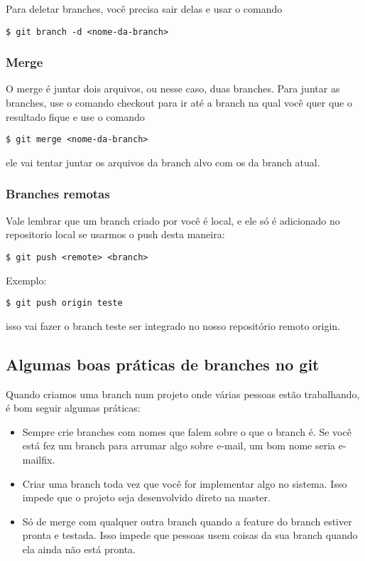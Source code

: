 \documentclass{article}
\begin{document}
    Para deletar branches, você precisa sair delas e usar o comando
\begin{tabbing}
    \hspace{1cm}\=\verb#$ git branch -d <nome-da-branch>#
\end{tabbing}

\subsubsection{Merge}
    O merge é juntar dois arquivos, ou nesse caso, duas branches. Para juntar as
branches, use o comando checkout para ir até a branch na qual você quer que o resultado
fique e use o comando 
\begin{tabbing}
    \hspace{1cm}\=\verb#$ git merge <nome-da-branch>#
\end{tabbing}
ele vai tentar juntar os arquivos da branch alvo com os da branch atual.


\subsubsection{Branches remotas}

Vale lembrar que um branch criado por você é local, e ele só é adicionado no repositorio 
local se usarmos o push desta maneira:
\begin{tabbing}
    \hspace{1cm}\=\verb#$ git push <remote> <branch>#\\
\end{tabbing} 
Exemplo: 
\begin{tabbing}
    \hspace{1cm}\=\verb#$ git push origin teste#\\
\end{tabbing} 
isso vai fazer o branch teste ser integrado no nosso repositório remoto origin.

\subsection{Algumas boas práticas de branches no git}
    Quando criamos uma branch num projeto onde várias pessoas estão trabalhando, é
bom seguir algumas práticas:
\begin{itemize}
    \item Sempre crie branches com nomes que falem sobre o que o branch é. Se
            você está fez um branch para arrumar algo sobre e-mail, um bom nome
            seria e-mailfix.
    \item Criar uma branch toda vez que você for implementar algo no sistema.
            Isso impede que o projeto seja desenvolvido direto na master.
    \item Só de merge com qualquer outra branch quando a feature do branch 
            estiver pronta e testada. Isso impede que pessoas usem coisas
            da sua branch quando ela ainda não está pronta.
\end{itemize}
\end{document}
